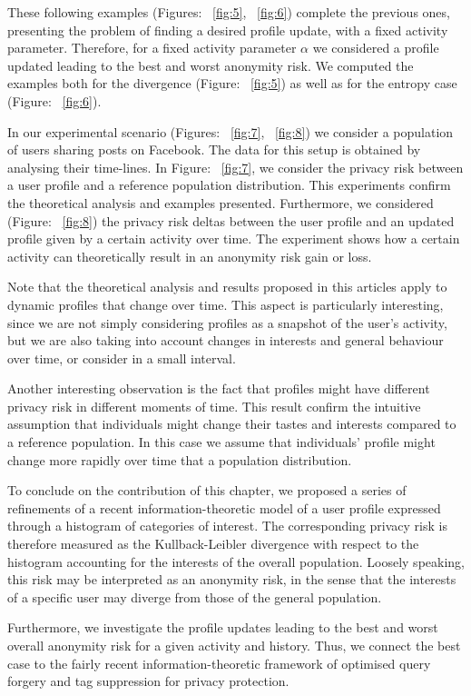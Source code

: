 These following examples (Figures: ~\ref{fig:5}, ~\ref{fig:6}) complete the previous ones, presenting the problem of finding a desired profile update, with a fixed activity parameter. Therefore, for a fixed activity parameter $\alpha$ we considered a profile updated leading to the best and worst anonymity risk. We computed the examples both for the divergence (Figure: ~\ref{fig:5}) as well as for the entropy case (Figure: ~\ref{fig:6}).

In our experimental scenario (Figures: ~\ref{fig:7}, ~\ref{fig:8}) we consider a population of users sharing posts on Facebook. The data for this setup is obtained by analysing their time-lines. In Figure: ~\ref{fig:7}, we consider the privacy risk between a user profile and a reference population distribution. This experiments confirm the theoretical analysis and examples presented. Furthermore, we considered (Figure: ~\ref{fig:8}) the privacy risk deltas between the user profile and an updated profile given by a certain activity over time. The experiment shows how a certain activity can theoretically result in an anonymity risk gain or loss.

Note that the theoretical analysis and results proposed in this articles apply to dynamic profiles that change over time. This aspect is particularly interesting, since we are not simply considering profiles as a snapshot of the user's activity, but we are also taking into account changes in interests and general behaviour over time, or consider in a small interval.

Another interesting observation is the fact that profiles might have different privacy risk in different moments of time. This result confirm the intuitive assumption that individuals might change their tastes and interests compared to a reference population. In this case we assume that individuals' profile might change more rapidly over time that a population distribution.

To conclude on the contribution of this chapter, we proposed a series of refinements of a recent information-theoretic model of a user profile expressed through a histogram of categories of interest. The corresponding privacy risk is therefore measured as the Kullback-Leibler divergence with respect to the histogram accounting for the interests of the overall population. Loosely speaking, this risk may be interpreted as an anonymity risk, in the sense that the interests of a specific user may diverge from those of the general population.

Furthermore, we investigate the profile updates leading to the best and worst overall anonymity risk for a given activity and history. Thus, we connect the best case to the fairly recent information-theoretic framework of optimised query forgery and tag suppression for privacy protection.

